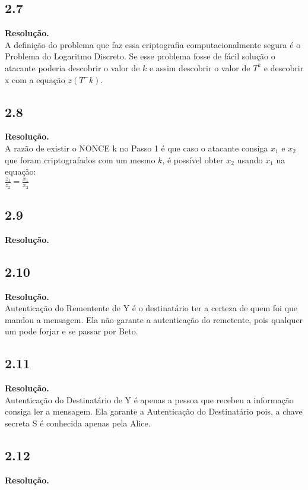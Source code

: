 \documentclass[12pt,letterpaper]{article}
\newcommand\answer{\textbf{Resolução.}\xspace}
\begin{document}
\subsection*{2.7}
\answer \\
    A definição do problema que faz essa criptografia computacionalmente segura é o Problema do Logaritmo Discreto. Se esse problema fosse de fácil solução o atacante poderia descobrir o valor de $k$ e assim descobrir o valor de $T^k$ e descobrir x com a equação $z(T^-k)$.

\subsection*{2.8}
\answer \\
    A razão de existir o NONCE k no Passo 1 é que caso o atacante consiga $x_1$ e $x_2$ que foram criptografados com um mesmo $k$, é possível obter $x_2$ usando $x_1$ na equação: \\
    $\frac{z_1}{z_2} = \frac{x_1}{x_2}$

\subsection*{2.9}
\answer \\

\subsection*{2.10}
\answer \\
    Autenticação do Rementente de Y é o destinatário ter a certeza de quem foi que mandou a mensagem. Ela não garante a autenticação do remetente, pois qualquer um pode forjar e se passar por Beto.

\subsection*{2.11}
\answer \\
    Autenticação do Destinatário de Y é apenas a pessoa que recebeu a informação consiga ler a mensagem. Ela garante a Autenticação do Destinatário pois, a chave secreta S é conhecida apenas pela Alice.

\subsection*{2.12}
\answer \\
\end{document}
